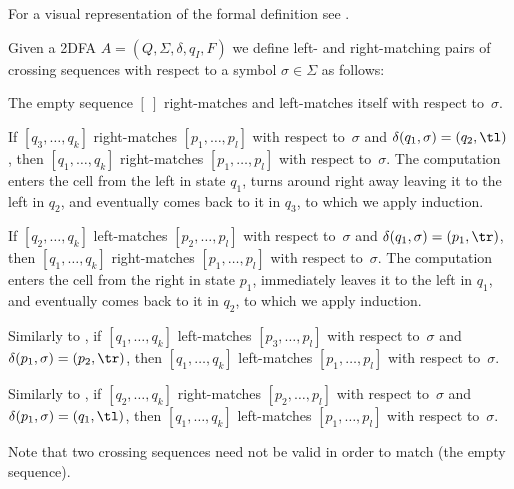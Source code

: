 For a visual representation of the formal definition see .
\begin{defn}
	Given a 2DFA $A=(Q,\Sigma,\delta,q_I,F)$ we define left- and right-matching pairs of crossing sequences with respect to a symbol $\sigma\in\Sigma$ as follows:
	\begin{rules}
		\item \label{itm:crossmatch2DFA-1} The empty sequence $[~]$ right-matches and left-matches itself with respect to~$\sigma$.
		\item \label{itm:crossmatch2DFA-2} If $[q_3,\dots,q_k]$ right-matches $[p_1,\dots,p_l]$ with respect to~$\sigma$ and $\delta(q_1,\sigma)=(q_2,\tl)$, then $[q_1,\dots,q_k]$ right-matches $[p_1,\dots,p_l]$ with respect to~$\sigma$.
		The computation enters the cell from the left in state $q_1$, turns around right away leaving it to the left in $q_2$, and eventually comes back to it in $q_3$, to which we apply induction.
		\item \label{itm:crossmatch2DFA-3} If $[q_2,\dots,q_k]$ left-matches $[p_2,\dots,p_l]$ with respect to~$\sigma$ and $\delta(q_1,\sigma)=(p_1,\tr)$, then $[q_1,\dots,q_k]$ right-matches $[p_1,\dots,p_l]$ with respect to~$\sigma$.
		The computation enters the cell from the right in state $p_1$, immediately leaves it to the left in $q_1$, and eventually comes back to it in $q_2$, to which we apply induction.
		\item \label{itm:crossmatch2DFA-4} Similarly to , if $[q_1,\dots,q_k]$ left-matches $[p_3,\dots,p_l]$ with respect to~$\sigma$ and $\delta(p_1,\sigma)=(p_2,\tr)$, then $[q_1,\dots,q_k]$ left-matches $[p_1,\dots,p_l]$ with respect to~$\sigma$.
		\item \label{itm:crossmatch2DFA-5} Similarly to , if $[q_2,\dots,q_k]$ right-matches $[p_2,\dots,p_l]$ with respect to~$\sigma$ and $\delta(p_1,\sigma)=(q_1,\tl)$, then $[q_1,\dots,q_k]$ left-matches $[p_1,\dots,p_l]$ with respect to~$\sigma$.
	\end{rules}
\end{defn}
Note that two crossing sequences need not be valid in order to match (\eg the empty sequence).

